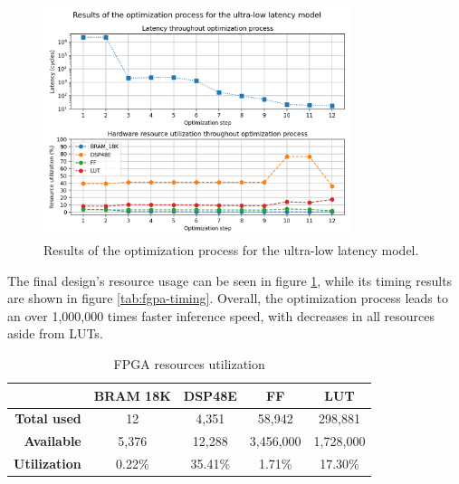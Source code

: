 \begin{figure}[hpt!]
  \centering
  \includegraphics[trim={0cm 0cm 0cm 1cm}, clip, width=0.8\textwidth, center]{../logs/hardware_optimizations.png}
  \caption{Results of the optimization process for the ultra-low latency model.}
  \label{fig:hardware-optimizations}
\end{figure}

The final design's resource usage can be seen in figure \ref{tab:utilization}, while its timing results are shown in figure \ref{tab:fgpa-timing}. Overall, the optimization process leads to an over 1,000,000 times faster inference speed, with decreases in all resources aside from LUTs.

\begin{table}[hpt!]
  \centering
  \caption{FPGA resources utilization}
  \label{tab:utilization}
  \bgroup
  \def\arraystretch{1.3}
  \setlength\tabcolsep{3mm}
  \begin{tabular}{r|c|c|c|c|}
  \cline{2-5}
  \multicolumn{1}{c|}{}                      & \textbf{BRAM 18K} & \textbf{DSP48E} & \textbf{FF} & \textbf{LUT} \\ \hline
  \multicolumn{1}{|r|}{\textbf{Total used}}       & 12                 & 4,351            & 58,942       & 298,881       \\ \hline
  \multicolumn{1}{|r|}{\textbf{Available}}   & 5,376              & 12,288           & 3,456,000     & 1,728,000      \\ \hline\hline
  \multicolumn{1}{|r|}{\textbf{Utilization}} & 0.22\%            & 35.41\%         & 1.71\%      & 17.30\%       \\ \hline
  \end{tabular}
  \egroup
\end{table}

